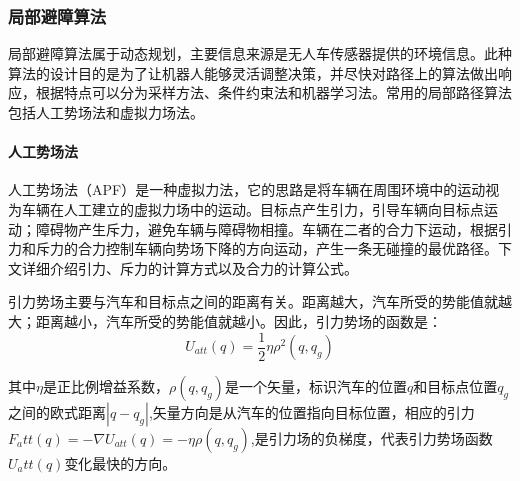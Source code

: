 \documentclass{report}
\begin{document}
\subsubsection{局部避障算法}
\label{subsec:label}
局部避障算法属于动态规划，主要信息来源是无人车传感器提供的环境信息。此种算法的设计目的是为了让机器人能够灵活调整决策，并尽快对路径上的算法做出响应，根据特点可以分为采样方法、条件约束法和机器学习法。常用的局部路径算法包括人工势场法和虚拟力场法。
\paragraph{人工势场法\cite{jh6}}

人工势场法（APF）是一种虚拟力法，它的思路是将车辆在周围环境中的运动视为车辆在人工建立的虚拟力场中的运动。目标点产生引力，引导车辆向目标点运动；障碍物产生斥力，避免车辆与障碍物相撞。车辆在二者的合力下运动，根据引力和斥力的合力控制车辆向势场下降的方向运动，产生一条无碰撞的最优路径。下文详细介绍引力、斥力的计算方式以及合力的计算公式。

引力势场主要与汽车和目标点之间的距离有关。距离越大，汽车所受的势能值就越大；距离越小，汽车所受的势能值就越小。因此，引力势场的函数是：
$$U_{att}(q)=\frac12\eta\rho^2(q,q_g)$$

其中$\eta$是正比例增益系数，$\rho(q,q_g)$是一个矢量，标识汽车的位置$q$和目标点位置$q_g$之间的欧式距离$|q-q_g|$,矢量方向是从汽车的位置指向目标位置，相应的引力$F_att(q)=-\nabla U_{att}(q)=-\eta\rho(q,q_g)$,是引力场的负梯度，代表引力势场函数$U_att(q)$变化最快的方向。
\end{document}
